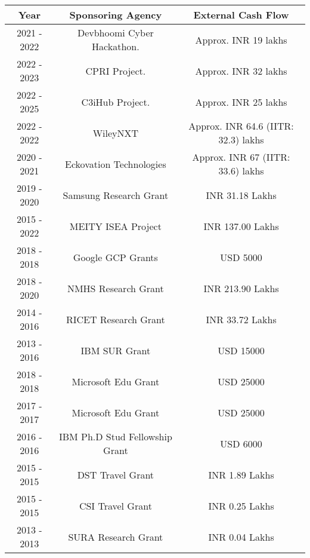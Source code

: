 	
	\begin{center}{\small
		\begin{tabular}{|c|c|c|}
			\hline \hline
			\textbf{Year} & \textbf{Sponsoring Agency} & \textbf{External Cash Flow} \\
			\hline \hline
			2021 - 2022 & Devbhoomi Cyber Hackathon. & Approx. INR 19 lakhs \\ %
			2022 - 2023 & CPRI Project. & Approx. INR 32 lakhs \\ %
			2022 - 2025 & C3iHub Project. & Approx. INR 25 lakhs \\ %
			2022 - 2022 & WileyNXT & Approx. INR 64.6 (IITR: 32.3) lakhs \\ %
			2020 - 2021 & Eckovation Technologies & Approx. INR 67 (IITR: 33.6) lakhs \\ %
			2019 - 2020 & Samsung Research Grant & INR 31.18 Lakhs \\  %
   		2015 - 2022 & MEITY ISEA Project & INR 137.00 Lakhs  \\ %
			2018 - 2018 & Google GCP Grants & USD 5000 \\  %
			2018 - 2020 & NMHS Research Grant& INR 213.90 Lakhs \\  %
			2014 - 2016 & RICET Research Grant & INR 33.72 Lakhs  \\ %
			2013 - 2016 & IBM SUR Grant & USD 15000 \\ %
			2018 - 2018 & Microsoft Edu Grant & USD 25000 \\ %
			2017 - 2017 & Microsoft Edu Grant & USD 25000 \\ %
			2016 - 2016 & IBM Ph.D Stud Fellowship Grant & USD 6000 \\ %
			2015 - 2015 & DST Travel Grant & INR 1.89 Lakhs \\ %
			2015 - 2015 & CSI Travel Grant & INR 0.25 Lakhs \\ %
			2013 - 2013 & SURA Research Grant & INR 0.04 Lakhs \\
			
			\hline \hline 
	\end{tabular}}
\end{center}